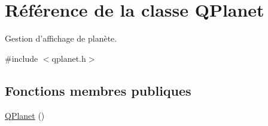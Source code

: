 \hypertarget{classQPlanet}{\section{Référence de la classe Q\-Planet}
\label{classQPlanet}
}


Gestion d'affichage de planète.  




{\ttfamily \#include $<$qplanet.\-h$>$}

\subsection*{Fonctions membres publiques}
\begin{DoxyCompactItemize}
\item 
\hypertarget{classQPlanet_afa6775658cbe4f0da0b2457e9dbdccab}{\hyperlink{classQPlanet_afa6775658cbe4f0da0b2457e9dbdccab}{Q\-Planet} ()}\label{classQPlanet_afa6775658cbe4f0da0b2457e9dbdccab}


\end{DoxyCompactItemize}
